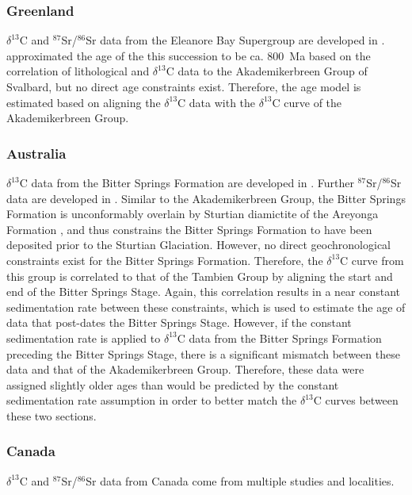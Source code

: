 \documentclass[11pt,letterpaper]{article}
\newcommand{\dC}{$\delta^{13}$C\xspace}
\newcommand{\SrSr}{$^{87}$Sr/$^{86}$Sr\xspace}
\begin{document}
\subsubsection*{Greenland}

\dC and \SrSr data from the Eleanore Bay Supergroup are developed in \citet{Cox2016a}. \citet{Halverson2004a} approximated the age of the this succession to be ca. 800~Ma based on the correlation of lithological and \dC data to the Akademikerbreen Group of Svalbard, but no direct age constraints exist. Therefore, the age model is estimated based on aligning the \dC data with the \dC curve of the Akademikerbreen Group.

\subsubsection*{Australia}

\dC data from the Bitter Springs Formation are developed in \citet{Swanson-Hysell2010a}. Further \SrSr data are developed in \citet{Cox2016a}. Similar to the Akademikerbreen Group, the Bitter Springs Formation is unconformably overlain by Sturtian diamictite of the Areyonga Formation \citep{Swanson-Hysell2010a}, and thus constrains the Bitter Springs Formation to have been deposited prior to the Sturtian Glaciation. However, no direct geochronological constraints exist for the Bitter Springs Formation. Therefore, the \dC curve from this group is correlated to that of the Tambien Group by aligning the start and end of the Bitter Springs Stage. Again, this correlation results in a near constant sedimentation rate between these constraints, which is used to estimate the age of data that post-dates the Bitter Springs Stage. However, if the constant sedimentation rate is applied to \dC data from the Bitter Springs Formation preceding the Bitter Springs Stage, there is a significant mismatch between these data and that of the Akademikerbreen Group. Therefore, these data were assigned slightly older ages than would be predicted by the constant sedimentation rate assumption in order to better match the \dC curves between these two sections.

\subsubsection*{Canada}

\dC and \SrSr data from Canada come from multiple studies and localities.
\end{document}
